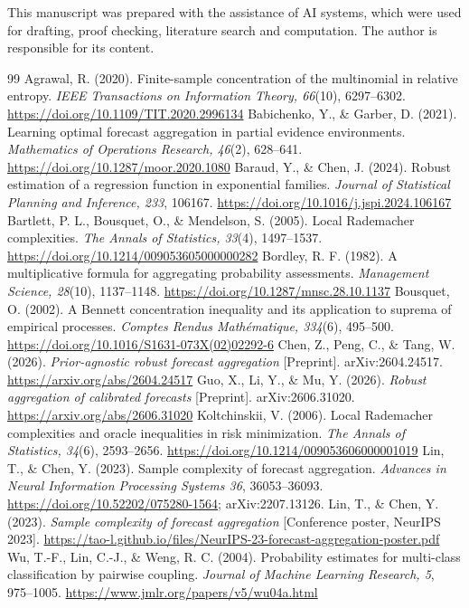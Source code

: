 \documentclass[11pt,a4paper]{article}
\theoremstyle{remark}
\begin{document}
This manuscript was prepared with the assistance of AI systems, which were used for drafting, proof checking, literature search and computation. The author is responsible for its content.

\begin{thebibliography}{99}
 Agrawal, R. (2020). Finite-sample concentration of the multinomial in relative entropy. \emph{IEEE Transactions on Information Theory, 66}(10), 6297--6302. \url{https://doi.org/10.1109/TIT.2020.2996134}
 Babichenko, Y., \& Garber, D. (2021). Learning optimal forecast aggregation in partial evidence environments. \emph{Mathematics of Operations Research, 46}(2), 628--641. \url{https://doi.org/10.1287/moor.2020.1080}
 Baraud, Y., \& Chen, J. (2024). Robust estimation of a regression function in exponential families. \emph{Journal of Statistical Planning and Inference, 233}, 106167. \url{https://doi.org/10.1016/j.jspi.2024.106167}
 Bartlett, P. L., Bousquet, O., \& Mendelson, S. (2005). Local Rademacher complexities. \emph{The Annals of Statistics, 33}(4), 1497--1537. \url{https://doi.org/10.1214/009053605000000282}
 Bordley, R. F. (1982). A multiplicative formula for aggregating probability assessments. \emph{Management Science, 28}(10), 1137--1148. \url{https://doi.org/10.1287/mnsc.28.10.1137}
 Bousquet, O. (2002). A Bennett concentration inequality and its application to suprema of empirical processes. \emph{Comptes Rendus Math\'ematique, 334}(6), 495--500. \url{https://doi.org/10.1016/S1631-073X(02)02292-6}
 Chen, Z., Peng, C., \& Tang, W. (2026). \emph{Prior-agnostic robust forecast aggregation} [Preprint]. arXiv:2604.24517. \url{https://arxiv.org/abs/2604.24517}
 Guo, X., Li, Y., \& Mu, Y. (2026). \emph{Robust aggregation of calibrated forecasts} [Preprint]. arXiv:2606.31020. \url{https://arxiv.org/abs/2606.31020}
 Koltchinskii, V. (2006). Local Rademacher complexities and oracle inequalities in risk minimization. \emph{The Annals of Statistics, 34}(6), 2593--2656. \url{https://doi.org/10.1214/009053606000001019}
 Lin, T., \& Chen, Y. (2023). Sample complexity of forecast aggregation. \emph{Advances in Neural Information Processing Systems 36}, 36053--36093. \url{https://doi.org/10.52202/075280-1564}; arXiv:2207.13126.
 Lin, T., \& Chen, Y. (2023). \emph{Sample complexity of forecast aggregation} [Conference poster, NeurIPS 2023]. \url{https://tao-l.github.io/files/NeurIPS-23-forecast-aggregation-poster.pdf}
 Wu, T.-F., Lin, C.-J., \& Weng, R. C. (2004). Probability estimates for multi-class classification by pairwise coupling. \emph{Journal of Machine Learning Research, 5}, 975--1005. \url{https://www.jmlr.org/papers/v5/wu04a.html}
\end{thebibliography}
\end{document}
